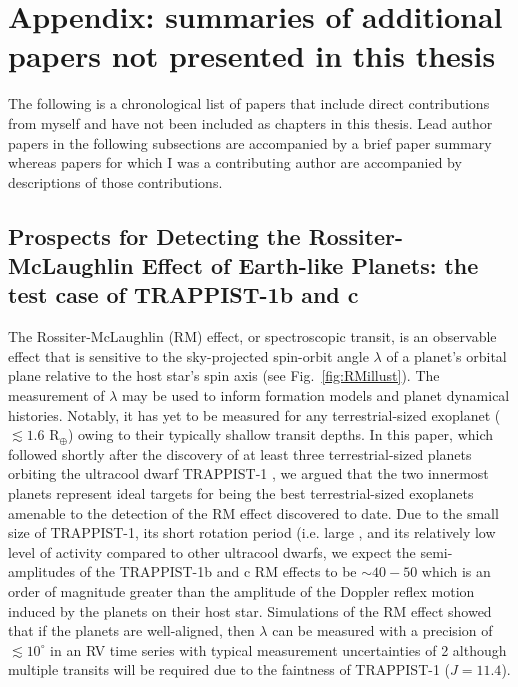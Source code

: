 \chapter[Appendix]{Appendix: summaries of additional papers not presented
  in this thesis}

The following is a chronological list of papers
that include direct contributions from myself and have not been included as
chapters in this thesis. Lead author papers in the following subsections 
are accompanied by a brief paper
summary whereas papers for which I was a contributing author are accompanied by
descriptions of those contributions.

\section{Prospects for Detecting the Rossiter-McLaughlin Effect of
  Earth-like Planets: the test case of TRAPPIST-1b and c \citep{cloutier16a}}
The Rossiter-McLaughlin (RM) effect, or spectroscopic transit, is an observable
effect that is sensitive to the sky-projected spin-orbit angle $\lambda$ of a
planet's orbital plane relative to the host star's spin axis (see
Fig.~\ref{fig:RMillust}). The measurement of $\lambda$ may
be used to inform formation models and planet dynamical histories. Notably, it
has yet to be measured for any terrestrial-sized exoplanet ($\lesssim 1.6$ R$_{\oplus}$)
owing to their typically shallow transit depths. 
In this paper, which followed shortly after the discovery of at least three
terrestrial-sized planets orbiting the ultracool dwarf TRAPPIST-1 
\citep{gillon16}, we
argued that the two innermost planets represent ideal targets for being
the best terrestrial-sized exoplanets amenable to the detection of the RM effect
discovered to date.
Due to the small size of TRAPPIST-1, its short rotation period (i.e. large \vsini{)}, and its
relatively low level of activity compared to other ultracool dwarfs, we expect
the semi-amplitudes of the TRAPPIST-1b and c RM effects to be $\sim 40-50$
\mps{} which is an order of magnitude greater than the amplitude of the
Doppler reflex motion induced by the planets on their host star.
Simulations of the RM effect showed that if the planets are
well-aligned, then $\lambda$ can be measured with a precision of
$\lesssim 10^{\circ}$ in an RV time series with typical measurement
uncertainties of 2 \mps{,} although multiple transits will be required due to the faintness
of TRAPPIST-1 ($J=11.4$).

